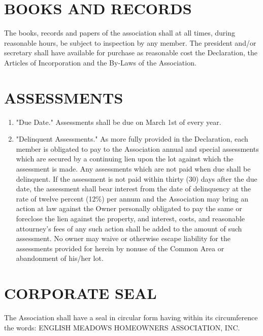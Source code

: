 \documentclass[12pt, letterpaper]{article}
\begin{document}
\section{BOOKS AND RECORDS}
The books, records and papers of the association shall at all times, during reasonable hours, be subject to inspection by any member.
The president and/or secretary shall have available for purchase as reasonable cost the Declaration, the Articles of Incorporation and the By-Laws of the Association.

\section{ASSESSMENTS}
\begin{enumerate}
 \item "Due Date."
  Assessments shall be due on March 1st of every year.
 \item "Delinquent Assessments."
  As more fully provided in the Declaration, each member is obligated to pay to the Association annual and special assessments which are secured by a continuing lien upon the lot against which the assessment is made.
  Any assessments which are not paid when due shall be delinquent.
  If the assessment is not paid within thirty (30) days after the due date, the assessment shall bear interest from the date of delinquency at the rate of twelve percent (12\%) per annum and the Association may bring an action at law against the Owner personally obligated to pay the same or foreclose the lien against the property, and interest, costs, and reasonable attourney's fees of any such action shall be added to the amount of such assessment.  No owner may waive or otherwise escape liability for the assessments provided for herein by nonuse of the Common Area or abandonment of his/her lot.
\end{enumerate}

\section{CORPORATE SEAL}
  The Association shall have a seal in circular form having within its circumference the words:
  ENGLISH MEADOWS HOMEOWNERS ASSOCIATION, INC.
\end{document}
